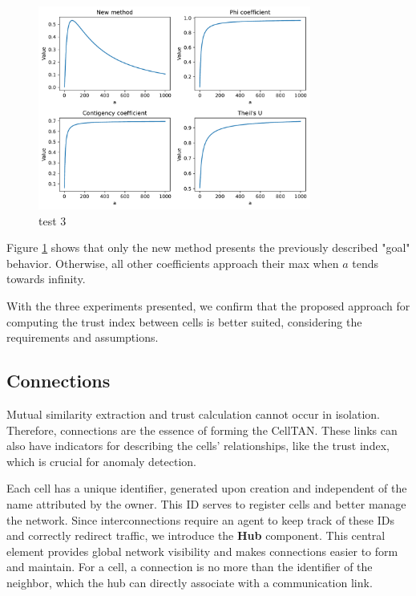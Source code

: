 \begin{figure}[h!]
\centering
    \includegraphics[width=0.8\textwidth]{figures/chapter4/cell/trust_tests/3.pdf}
    \caption{test 3}
    \label{fig:trust_test_3}
\end{figure}
\FloatBarrier

Figure \ref{fig:trust_test_3} shows that only the new method presents the previously described "goal" behavior. Otherwise, all other coefficients approach their max when $a$ tends towards infinity.

With the three experiments presented, we confirm that the proposed approach for computing the trust index between cells is better suited, considering the requirements and assumptions.

\subsection{Connections}

Mutual similarity extraction and trust calculation cannot occur in isolation. Therefore, connections are the essence of forming the CellTAN. These links can also have indicators for describing the cells' relationships, like the trust index, which is crucial for anomaly detection.

Each cell has a unique identifier, generated upon creation and independent of the name attributed by the owner. This ID serves to register cells and better manage the network. Since interconnections require an agent to keep track of these IDs and correctly redirect traffic, we introduce the \textbf{Hub} component. This central element provides global network visibility and makes connections easier to form and maintain. For a cell, a connection is no more than the identifier of the neighbor, which the hub can directly associate with a communication link.

